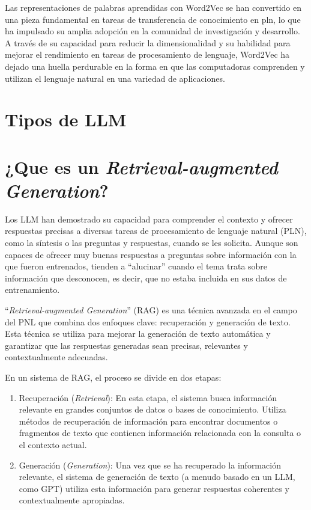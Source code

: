 Las representaciones de palabras aprendidas con Word2Vec se han convertido en una pieza fundamental en tareas de transferencia de conocimiento en \acrshoert
pln, lo que ha impulsado su amplia adopción en la comunidad de investigación y desarrollo. A través de su capacidad para reducir la dimensionalidad y su habilidad para mejorar el rendimiento en tareas de procesamiento de lenguaje, Word2Vec ha dejado una huella perdurable en la forma en que las computadoras comprenden y utilizan el lenguaje natural en una variedad de aplicaciones.

\section{Tipos de LLM}


\section{¿Que es un \textit{Retrieval-augmented Generation}?}

Los LLM han demostrado su capacidad para comprender el contexto y ofrecer respuestas precisas a diversas tareas de procesamiento de lenguaje natural (PLN), como la síntesis o las preguntas y respuestas, cuando se les solicita. Aunque son capaces de ofrecer muy buenas respuestas a preguntas sobre información con la que fueron entrenados, tienden a ``alucinar'' cuando el tema trata sobre información que desconocen, es decir, que no estaba incluida en sus datos de entrenamiento.

``\textit{Retrieval-augmented Generation}'' (RAG) es una técnica avanzada en el campo del PNL que combina dos enfoques clave: recuperación y generación de texto. Esta técnica se utiliza para mejorar la generación de texto automática y garantizar que las respuestas generadas sean precisas, relevantes y contextualmente adecuadas\cite{Lewis2020}.

En un sistema de RAG, el proceso se divide en dos etapas:

\begin{enumerate}
    \item Recuperación (\textit{Retrieval}): En esta etapa, el sistema busca información relevante en grandes conjuntos de datos o bases de conocimiento. Utiliza métodos de recuperación de información para encontrar documentos o fragmentos de texto que contienen información relacionada con la consulta o el contexto actual.

    \item Generación (\textit{Generation}): Una vez que se ha recuperado la información relevante, el sistema de generación de texto (a menudo basado en un LLM, como GPT) utiliza esta información para generar respuestas coherentes y contextualmente apropiadas.
    
\end{enumerate}

